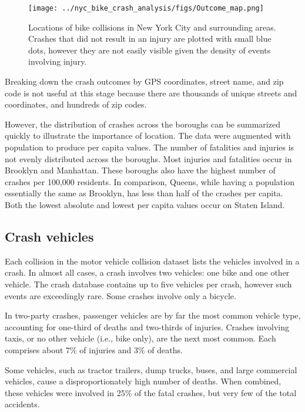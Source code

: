\documentclass[twocolumn,oneside]{article}
\begin{document}
\begin{figure}[h]
\centering
  \texttt{[image: ../nyc\_bike\_crash\_analysis/figs/Outcome\_map.png]}
  \caption{Locations of bike collisions in New York City and
    surrounding areas.  Crashes that did not result in an injury are
    plotted with small blue dots, however they are not easily visible
    given the density of events involving injury.}
\label{fig:outcome_map}
\end{figure}

Breaking down the crash outcomes by GPS coordinates, street name, and
zip code is not useful at this stage because there are thousands of
unique streets and coordinates, and hundreds of zip codes.

However, the distribution of crashes across the boroughs can be
summarized quickly to illustrate the importance of location.  The data
were augmented with population to produce per capita values.  The
number of fatalities and injuries is not evenly distributed across the
boroughs.  Most injuries and fatalities occur in Brooklyn and
Manhattan.  These boroughs also have the highest number of crashes per
100,000 residents.  In comparison, Queens, while having a population
essentially the same as Brooklyn, has less than half of the crashes
per capita.  Both the lowest absolute and lowest per capita values
occur on Staten Island.

\subsection{Crash vehicles}

Each collision in the motor vehicle collision dataset lists the
vehicles involved in a crash.  In almost all cases, a crash involves
two vehicles: one bike and one other vehicle.  The crash database
contains up to five vehicles per crash, however such events are
exceedingly rare.  Some crashes involve only a bicycle.

In two-party crashes, passenger vehicles are by far the most common
vehicle type, accounting for one-third of deaths and two-thirds of
injuries.  Crashes involving taxis, or no other vehicle (i.e., bike
only), are the next most common.  Each comprises about 7\% of injuries
and 3\% of deaths.

Some vehicles, such as tractor trailers, dump trucks, buses, and large
commercial vehicles, cause a disproportionately high number of deaths.
When combined, these vehicles were involved in 25\% of the fatal
crashes, but very few of the total accidents.
\end{document}
